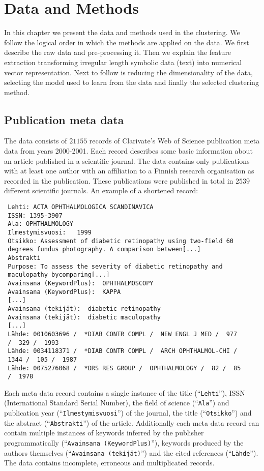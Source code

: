 \chapter{Data and Methods}
\label{chapter:methods}
In this chapter we present the data and methods used in the 
clustering. We follow the logical order in which the methods are 
applied on the data. We first describe the raw data and  
pre-processing it. Then we explain the feature extraction 
transforming irregular length symbolic data (text) into numerical 
vector representation. Next to follow is reducing the 
dimensionality of the data, selecting the model used to learn from 
the data and finally the selected clustering method.

\section{Publication meta data}
\label{section:metadata}
The data consists of $21155$ records of Clarivate's Web of Science 
publication meta data from years 2000-2001. Each record describes some 
basic information about an article published in a scientific 
journal. The data contains only publications with at least one
author with an affiliation to a Finnish research organisation as
recorded in the publication. These publications were published in 
total in $2539$ different scientific journals.
An example of a shortened record:
\begin{verbatim}
 Lehti: ACTA OPHTHALMOLOGICA SCANDINAVICA
 ISSN: 1395-3907
 Ala: OPHTHALMOLOGY
 Ilmestymisvuosi:   1999
 Otsikko: Assessment of diabetic retinopathy using two-field 60 
 degrees fundus photography. A comparison between[...]
 Abstrakti
 Purpose: To assess the severity of diabetic retinopathy and 
 maculopathy bycomparing[...]
 Avainsana (KeywordPlus):  OPHTHALMOSCOPY
 Avainsana (KeywordPlus):  KAPPA
 [...]
 Avainsana (tekijät):  diabetic retinopathy
 Avainsana (tekijät):  diabetic maculopathy
 [...]
 Lähde: 0010603696 /  *DIAB CONTR COMPL /  NEW ENGL J MED /  977 
 /  329 /  1993
 Lähde: 0034118371 /  *DIAB CONTR COMPL /  ARCH OPHTHALMOL-CHI /  
 1344 /  105 /  1987
 Lähde: 0075276068 /  *DRS RES GROUP /  OPHTHALMOLOGY /  82 /  85 
 /  1978
 \end{verbatim}
 
Each meta data record contains a single instance of the title 
(``\texttt{Lehti}''), ISSN (International Standard Serial Number), 
the field of science (``\texttt{Ala}'') and publication year 
(``\texttt{Ilmestymisvuosi}'') of the journal, the title 
(``\texttt{Otsikko}'') and the abstract (``\texttt{Abstrakti}'') 
of the article. Additionally each meta data record can contain
multiple instances of keywords inferred by the publisher programmatically
(``\texttt{Avainsana (KeywordPlus)}''), keywords produced by the 
authors themselves (``\texttt{Avainsana (tekijät)}'') and the 
cited references (``\texttt{Lähde}''). The data contains incomplete,
erroneous and multiplicated records.

